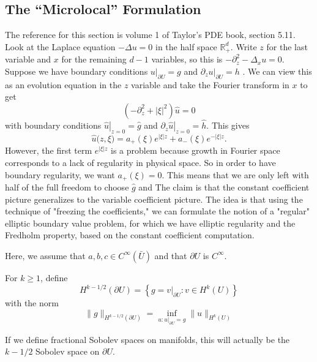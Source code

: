 \subsection{The ``Microlocal'' Formulation}
The reference for this section is volume 1 of Taylor's PDE book, section 5.11. Look at the Laplace equation $-\Delta u=0$ in the half space $\mathbb{R}_{+}^{d}$. Write $z$ for the last variable and $x$ for the remaining $d-1$ variables, so this is $-\partial_{z}^{2}-\Delta_{x} u=0$. Suppose we have boundary conditions $\left.u\right|_{\partial U}= g$  and $\left.\partial_{z} u\right|_{\partial U}=h$ . We can view this as an evolution equation in the $z$ variable and take the Fourier transform in $x$ to get
$$
\left(-\partial_{z}^{2}+|\xi|^{2}\right) \widehat{u}=0
$$
with boundary conditions $\left.\widehat{u}\right|_{z=0}=\hat g$ and $\left.\partial_{z} \widehat{u}\right|_{z=0}=\hat h$. This gives
$$
\widehat u {(z}, \xi)=a_{+}(\xi) e^{|\xi| z}+a_{-}(\xi) e^{-|\xi| z} .
$$
However, the first term $e^{|\xi| z}$ is a problem because growth in Fourier space corresponds to a lack of regularity in physical space. So in order to have boundary regularity, we want $a_{+}(\xi)=0$. This means that we are only left with half of the full freedom to choose $\widehat{g}$ and
The claim is that the constant coefficient picture generalizes to the variable coefficient picture. The idea is that using the technique of "freezing the coefficients," we can formulate the notion of a "regular" elliptic boundary value problem, for which we have elliptic regularity and the Fredholm property, based on the constant coefficient computation.

Here, we assume that $a, b, c \in C^{\infty}(\bar{U})$ and that $\partial U$ is $C^{\infty}$.


\begin{definition}
[$H^{k-1/2}$]
\label{def: Hk-1/2}
For $k \geq 1$, define
$$
H^{k-1 / 2}(\partial U)=\left\{g=\left.v\right|_{\partial U}: v \in H^{k}(U)\right\}
$$
with the norm
$$
\|g\|_{H^{k-1 / 2}(\partial U)}=\inf _{u:\left.u\right|_{\partial U}=g}\|u\|_{H^{k}(U)}
$$
\end{definition}

\begin{remark}
If we define fractional Sobolev spaces on manifolds, this will actually be the $k-1 / 2$ Sobolev space on $\partial U$.
\end{remark}

